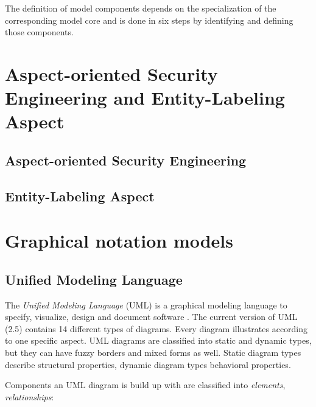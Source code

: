 \documentclass[twoside, openright, 12pt]{book}
\begin{document}
The definition of model components depends on the specialization of the corresponding model core and is done in six steps by identifying and defining those components.



\section{Aspect-oriented Security Engineering and Entity-Labeling Aspect}
\label{AOSEEL}


\subsection{Aspect-oriented Security Engineering}
\label{AOSE}


\subsection{Entity-Labeling Aspect}
\label{EL}




\section{Graphical notation models}
\label{graphical_notations}

\subsection{Unified Modeling Language}
\label{UML}
The \textit{Unified Modeling Language} (UML) is a graphical modeling language to specify, visualize, design and document software \citep{UML}.
The current version of UML (2.5) contains 14 different types of diagrams.
Every diagram illustrates according to one specific aspect.
UML diagrams are classified into static and dynamic types, but they can have fuzzy borders and mixed forms as well.
Static diagram types describe structural properties, dynamic diagram types behavioral properties.

Components an UML diagram is build up with are classified into \textit{elements}, \textit{relationships}:
\end{document}
